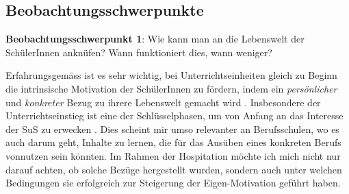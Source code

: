 \subsection{Beobachtungsschwerpunkte}

\begin{myExBox}[title=Beobachtungsschwerpunkt 1]
  \textbf{Beobachtungsschwerpunkt 1}: Wie kann man an die Lebenswelt der SchülerInnen anknüfen? Wann funktioniert dies, wann weniger?

  Erfahrungsgemäss ist es sehr wichtig, bei Unterrichtseinheiten gleich zu Beginn die intrinsische Motivation der SchülerInnen zu fördern, indem ein \textit{persönlicher} und \textit{konkreter} Bezug zu ihrere Lebenswelt gemacht wird \cite{kaiser}. Insbesondere der Unterrichtseinstieg ist eine der Schlüsselphasen, um von Anfang an das Interesse der SuS zu erwecken \cite{roth, grell}. Dies scheint mir umso relevanter an Berufsschulen, wo es auch darum geht, Inhalte zu lernen, die für das Ausüben eines konkreten Berufs vonnutzen sein könnten. Im Rahmen der Hospitation möchte ich mich nicht nur darauf achten, ob solche Bezüge hergestellt wurden, sondern auch unter welchen Bedingungen sie erfolgreich zur Steigerung der Eigen-Motivation geführt haben.
\end{myExBox}
